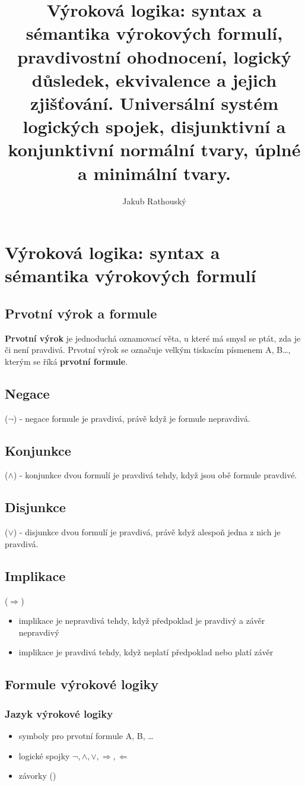 \documentclass{szzclass}
\title{Výroková logika: syntax a sémantika výrokových formulí, pravdivostní ohodnocení, logický důsledek, ekvivalence a jejich zjišťování. Universální systém logických spojek, disjunktivní a konjunktivní normální tvary, úplné a minimální tvary.}
\author{Jakub Rathouský}
\begin{document}
\maketitle
\tableofcontents
\newpage

\section{Výroková logika: syntax a sémantika výrokových formulí}
\subsection{Prvotní výrok a formule}
\textbf{Prvotní výrok} je jednoduchá oznamovací věta, u které má smysl se ptát, zda je či není pravdivá.
Prvotní výrok se označuje velkým tiskacím písmenem A, B\dots, kterým se říká \textbf{prvotní formule}.
\subsection{Negace}
($\neg$) - negace formule je pravdivá, právě když je formule nepravdivá.
\subsection{Konjunkce}
($\wedge$) - konjunkce dvou formulí je pravdivá tehdy, když jsou obě formule pravdivé.
\subsection{Disjunkce}
($\vee$) - disjunkce dvou formulí je pravdivá, právě když alespoň jedna z nich je pravdivá.
\subsection{Implikace}
($\Rightarrow$)
\begin{itemize}
	\item implikace je nepravdivá tehdy, když předpoklad je pravdivý a závěr nepravdivý
	\item implikace je pravdivá tehdy, když neplatí předpoklad nebo platí závěr
\end{itemize}
\subsection{Formule výrokové logiky}
\subsubsection{Jazyk výrokové logiky}
\begin{itemize}
	\item symboly pro prvotní formule A, B, \dots
	\item logické spojky $\neg, \wedge, \vee, \Rightarrow, \Leftarrow$
	\item závorky ()
\end{itemize}
\end{document}
